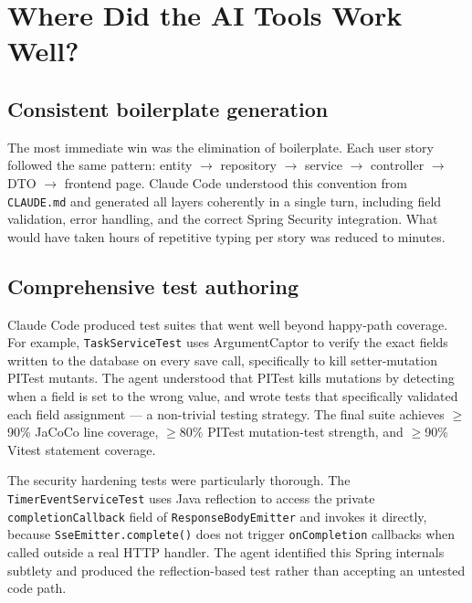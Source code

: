 \documentclass[a4paper, 12pt]{article}
\begin{document}
\section{Where Did the AI Tools Work Well?}

\subsection{Consistent boilerplate generation}

The most immediate win was the elimination of boilerplate. Each user story followed the same
pattern: entity $\rightarrow$ repository $\rightarrow$ service $\rightarrow$ controller
$\rightarrow$ DTO $\rightarrow$ frontend page. Claude Code understood this convention from
\texttt{CLAUDE.md} and generated all layers coherently in a single turn, including field
validation, error handling, and the correct Spring Security integration. What would have
taken hours of repetitive typing per story was reduced to minutes.

\subsection{Comprehensive test authoring}

Claude Code produced test suites that went well beyond happy-path coverage. For example,
\texttt{TaskServiceTest} uses ArgumentCaptor to verify the exact fields written to the
database on every save call, specifically to kill setter-mutation PITest mutants. The agent
understood that PITest kills mutations by detecting when a field is set to the wrong value,
and wrote tests that specifically validated each field assignment --- a non-trivial testing
strategy. The final suite achieves $\geq$90\% JaCoCo line coverage, $\geq$80\% PITest
mutation-test strength, and $\geq$90\% Vitest statement coverage.

The security hardening tests were particularly thorough. The \texttt{TimerEventServiceTest}
uses Java reflection to access the private \texttt{completionCallback} field of
\texttt{ResponseBodyEmitter} and invokes it directly, because
\texttt{SseEmitter.complete()} does not trigger \texttt{onCompletion} callbacks when called
outside a real HTTP handler. The agent identified this Spring internals subtlety and produced
the reflection-based test rather than accepting an untested code path.
\end{document}
